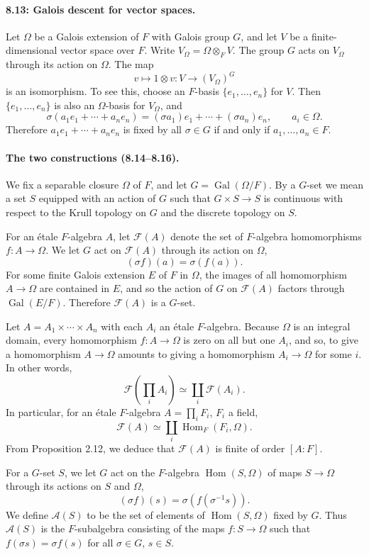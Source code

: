 \documentclass[UTF8,11pt]{ctexart}
\theoremstyle{definition}
\begin{document}
\paragraph{8.13: Galois descent for vector spaces.}
Let $\Omega$ be a Galois extension of $F$ with Galois group $G$, and let $V$ be a finite-dimensional vector space over $F$. Write $V_\Omega=\Omega\otimes_F V$. The group $G$ acts on $V_\Omega$ through its action on $\Omega$. The map
\[v\longmapsto1\otimes v:V\longrightarrow (V_\Omega)^G\]
is an isomorphism. To see this, choose an $F$-basis $\{e_1,\ldots,e_n\}$ for $V$. Then $\{e_1,\ldots,e_n\}$ is also an $\Omega$-basis for $V_\Omega$, and
\[\sigma(a_1e_1+\cdots+a_ne_n)=(\sigma a_1)e_1+\cdots+(\sigma a_n)e_n,\qquad a_i\in\Omega.\]
Therefore $a_1e_1+\cdots+a_ne_n$ is fixed by all $\sigma\in G$ if and only if $a_1,\ldots,a_n\in F$.

\paragraph{The two constructions (8.14--8.16).}
We fix a separable closure $\Omega$ of $F$, and let $G=\operatorname{Gal}(\Omega/F)$. By a $G$-set we mean a set $S$ equipped with an action of $G$ such that $G\times S\to S$ is continuous with respect to the Krull topology on $G$ and the discrete topology on $S$.

For an \'etale $F$-algebra $A$, let $\mathcal F(A)$ denote the set of $F$-algebra homomorphisms $f:A\to\Omega$. We let $G$ act on $\mathcal F(A)$ through its action on $\Omega$,
\[(\sigma f)(a)=\sigma(f(a)).\]
For some finite Galois extension $E$ of $F$ in $\Omega$, the images of all homomorphism $A\to\Omega$ are contained in $E$, and so the action of $G$ on $\mathcal F(A)$ factors through $\operatorname{Gal}(E/F)$. Therefore $\mathcal F(A)$ is a $G$-set.

Let $A=A_1\times\cdots\times A_n$ with each $A_i$ an \'etale $F$-algebra. Because $\Omega$ is an integral domain, every homomorphism $f:A\to\Omega$ is zero on all but one $A_i$, and so, to give a homomorphism $A\to\Omega$ amounts to giving a homomorphism $A_i\to\Omega$ for some $i$. In other words,
\[\mathcal F\left(\prod_i A_i\right)\simeq\coprod_i\mathcal F(A_i).\]
In particular, for an \'etale $F$-algebra $A=\prod_iF_i$, $F_i$ a field,
\[\mathcal F(A)\simeq\coprod_i\operatorname{Hom}_F(F_i,\Omega).\]
From Proposition 2.12, we deduce that $\mathcal F(A)$ is finite of order $[A:F]$.

For a $G$-set $S$, we let $G$ act on the $F$-algebra $\operatorname{Hom}(S,\Omega)$ of maps $S\to\Omega$ through its actions on $S$ and $\Omega$,
\[(\sigma f)(s)=\sigma(f(\sigma^{-1}s)).\]
We define $\mathcal A(S)$ to be the set of elements of $\operatorname{Hom}(S,\Omega)$ fixed by $G$. Thus $\mathcal A(S)$ is the $F$-subalgebra consisting of the maps $f:S\to\Omega$ such that $f(\sigma s)=\sigma f(s)$ for all $\sigma\in G$, $s\in S$.
\end{document}

